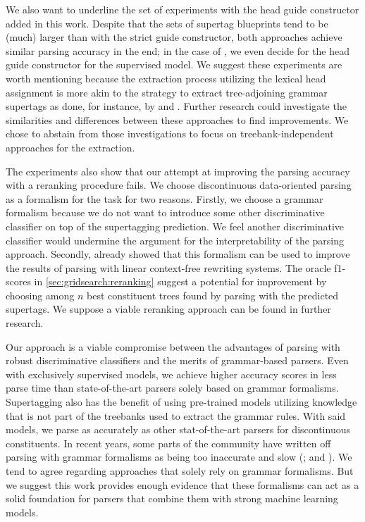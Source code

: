 \documentclass[../document.tex]{subfiles}
\begin{document}
    We also want to underline the set of experiments with the head guide constructor added in this work.
    Despite that the sets of supertag blueprints tend to be (much) larger than with the strict guide constructor, both approaches achieve similar parsing accuracy in the end; in the case of , we even decide for the head guide constructor for the supervised model.
    We suggest these experiments are worth mentioning because the extraction process utilizing the lexical head assignment is more akin to the strategy to extract tree-adjoining grammar supertags as done, for instance, by \citet{Kaeshammer2012GermanAE} and \citet{Bla18}.
    Further research could investigate the similarities and differences between these approaches to find improvements.
    We chose to abstain from those investigations to focus on treebank-independent approaches for the extraction.

    The experiments also show that our attempt at improving the parsing accuracy with a reranking procedure fails.
    We choose discontinuous data-oriented parsing as a formalism for the task for two reasons.
        Firstly, we choose a grammar formalism because we do not want to introduce some other discriminative classifier on top of the supertagging prediction.
        We feel another discriminative classifier would undermine the argument for the interpretability of the parsing approach.
        Secondly, \citet{CraSchBod16} already showed that this formalism can be used to improve the results of parsing with linear context-free rewriting systems.
    The oracle f1-scores in \cref{sec:gridsearch:reranking} suggest a potential for improvement by choosing among \(n\) best constituent trees found by parsing with the predicted supertags.
    We suppose a viable reranking approach can be found in further research.

    Our approach is a viable compromise between the advantages of parsing with robust discriminative classifiers and the merits of grammar-based parsers.
    Even with exclusively supervised models, we achieve higher accuracy scores in less parse time than state-of-the-art parsers solely based on grammar formalisms.
    Supertagging also has the benefit of using pre-trained models utilizing knowledge that is not part of the treebanks used to extract the grammar rules.
    With said models, we parse as accurately as other stat-of-the-art parsers for discontinuous constituents.
    In recent years, some parts of the  community have written off parsing with grammar formalisms as being too inaccurate and slow (\citealp[Section~1]{StaSte20}; and \citealp[Section~10]{zhang2020survey}).
    We tend to agree regarding approaches that solely rely on grammar formalisms.
    But we suggest this work provides enough evidence that these formalisms can act as a solid foundation for parsers that combine them with strong machine learning models.
\end{document}
